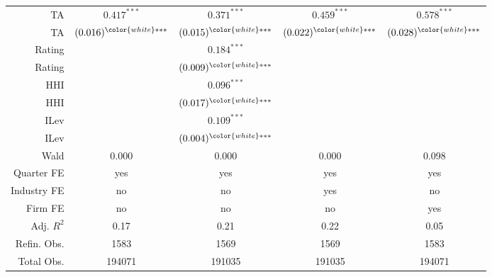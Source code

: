 \begin{table}[ht]
\begin{tabular}{rcccc}
  TA & $0.417^{***}$ & $0.371^{***}$ & $0.459^{***}$ & $0.578^{***}$ \\ 
  \color{white}TA & $(0.016)^{\color{white}***}$ & $(0.015)^{\color{white}***}$ & $(0.022)^{\color{white}***}$ & $(0.028)^{\color{white}***}$ \\ 
  Rating &  & $0.184^{***}$ &  &  \\ 
  \color{white}Rating &  & $(0.009)^{\color{white}***}$ &  &  \\ 
  HHI &  & $0.096^{***}$ &  &  \\ 
  \color{white}HHI &  & $(0.017)^{\color{white}***}$ &  &  \\ 
  ILev &  & $0.109^{***}$ &  &  \\ 
  \color{white}ILev &  & $(0.004)^{\color{white}***}$ &  &  \\ 
   \hline
Wald & 0.000 & 0.000 & 0.000 & 0.098 \\ 
  Quarter FE & yes & yes & yes & yes \\ 
  Industry FE & no & no & yes & no \\ 
  Firm FE & no & no & no & yes \\ 
  Adj. $R^2$ & 0.17 & 0.21 & 0.22 & 0.05 \\ 
  Refin. Obs. & 1583 & 1569 & 1569 & 1583 \\ 
  Total Obs. & 194071 & 191035 & 191035 & 194071 \\ 
   \hline
\end{tabular}
\end{table}
